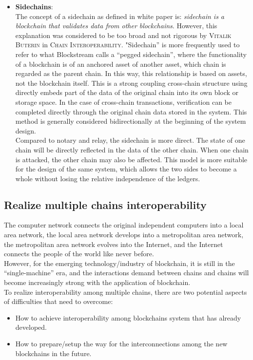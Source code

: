 \begin{itemize}
    \item \textbf{Sidechains}:\\
     The concept of a sidechain as defined in white paper\cite{back2014enabling} is: \textit{sidechain is a blockchain that validates data from other blockchains}. However, this explanation was considered to be too broad and not rigorous by \textsc{Vitalik Buterin} in \textsc{Chain Interoperability}\cite{buterin2016chain}. "Sidechain” is more frequently used to refer to what Blockstream calls a “pegged sidechain”, where the functionality of a blockchain is of an anchored asset of another asset, which chain is regarded as the parent chain. In this way, this relationship is based on assets, not the blockchain itself. This is a strong coupling cross-chain structure using directly embeds part of the data of the original chain into its own block or storage space. In the case of cross-chain transactions,  verification can be completed directly through the original chain data stored in the system. This method is generally considered bidirectionally at the beginning of the system design.\\
     Compared to notary and relay, the sidechain is more direct. The state of one chain will be directly reflected in the data of the other chain. When one chain is attacked, the other chain may also be affected. This model is more suitable for the design of the same system, which allows the two sides to become a whole without losing the relative independence of the ledgers.

\end{itemize}
\subsection{Realize multiple chains interoperability}
\noindent The computer network connects the original independent computers into a local area network, the local area network develops into a metropolitan area network, the metropolitan area network evolves into the Internet, and the Internet connects the people of the world like never before.\\
\noindent However, for the emerging technology/industry of blockchain, it is still in the “single-machine” era, and the interactions demand between chains and chains will become increasingly strong with the application of blockchain.\\
\noindent To realize interoperability among multiple chains, there are two potential aspects of difficulties that need to overcome: 
\begin{itemize}
    \item How to achieve interoperability among blockchains system that has already developed.
    \item How to prepare/setup the way for the interconnections among the new blockchains in the future.
\end{itemize}


